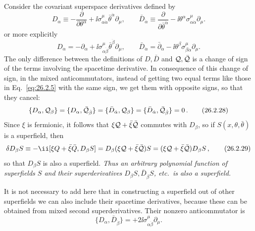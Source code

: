 Consider the covariant superspace derivatives defined by
\begin{equation}
  D_\alpha\equiv-\frac{\partial}{\partial\theta^\alpha}
  +\ii\sigma^\mu_{\alpha\dot\alpha}\bar\theta^{\dot\alpha}\partial_\mu,
  \qquad
  \bar D_{\dot\alpha}
  \equiv\frac{\partial}{\partial\bar\theta^{\dot\alpha}}
  -\ii\theta^\alpha\sigma^\mu_{\alpha\dot\alpha}\partial_\mu .
  \tag{26.2.26}\label{eq:26.2.26}
\end{equation}
or more explicitly
\begin{equation}
  D_\alpha=-\partial_\alpha
  +\ii\sigma^\mu_{\alpha\dot\beta}\bar\theta^{\dot\beta}\partial_\mu,
  \qquad
  \bar D_{\dot\alpha}=\bar\partial_{\dot\alpha}
  -\ii\theta^\beta\sigma^\mu_{\beta\dot\alpha}\partial_\mu .
  \tag{26.2.27}\label{eq:26.2.27}
\end{equation}
The only difference between the definitions of \(D,\bar D\) and
\(\mathcal{Q},\bar{\mathcal{Q}}\) is a
change of sign of the terms involving the spacetime derivative. In
consequence of this change of sign, in the mixed anticommutators, instead of
getting two equal terms like those in
Eq.~\eqref{eq:26.2.5} with the same sign, we get them with opposite signs, so
that they cancel:
\begin{equation}
  \{D_\alpha,\mathcal{Q}_\beta\}
  =\{D_\alpha,\bar{\mathcal{Q}}_{\dot\beta}\}
  =\{\bar D_{\dot\alpha},\mathcal{Q}_\beta\}
  =\{\bar D_{\dot\alpha},\bar{\mathcal{Q}}_{\dot\beta}\}=0\,.
  \tag{26.2.28}\label{eq:26.2.28}
\end{equation}
Since \(\xi\) is fermionic, it follows that
\(\xi\mathcal{Q}+\bar\xi\bar{\mathcal{Q}}\) commutes with \(D_\beta\), so if
\(S(x,\theta,\bar\theta)\) is a superfield, then
\begin{equation}
  \delta D_\beta S
  \equiv-\ii[\xi Q+\bar\xi\bar Q,D_\beta S]
  =D_\beta(\xi\SuperQ+\bar\xi\bar{\SuperQ})S
  =(\xi\SuperQ+\bar\xi\bar{\SuperQ})D_\beta S\,,
  \tag{26.2.29}\label{eq:26.2.29}
\end{equation}
so that \(D_\beta S\) is also a superfield.
\emph{Thus an arbitrary polynomial function of superfields $S$ and their
superderivatives \(D_\beta S,\bar D_{\dot\beta}S\), etc.\
is also a superfield.}

It is not necessary to add here that in constructing a superfield out of other
superfields we can also include their spacetime derivatives, because these can
be obtained from mixed second superderivatives. Their nonzero
anticommutator is
\begin{equation}
  \{D_\alpha,\bar D_{\dot\beta}\}
  =+2\ii\sigma^\mu_{\alpha\dot\beta}\partial_\mu .
  \tag{26.2.30}\label{eq:26.2.30}
\end{equation}

